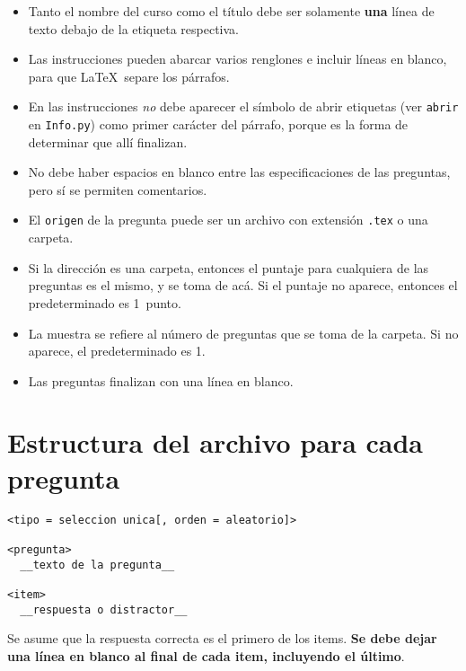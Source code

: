\documentclass[12pt]{article}
\theoremstyle{definition}
\begin{document}
\begin{itemize}
  \item Tanto el nombre del curso como el título debe ser solamente \textbf{una} línea de texto debajo de la etiqueta respectiva.
  \item Las instrucciones pueden abarcar varios renglones e incluir líneas en blanco, para que \LaTeX\ separe los párrafos. 
  \item En las instrucciones \emph{no} debe aparecer el símbolo de abrir etiquetas (ver \verb|abrir| en \verb|Info.py|) como primer carácter del párrafo, porque es la forma de determinar que allí finalizan.
  \item No debe haber espacios en blanco entre las especificaciones de las preguntas, pero sí se permiten comentarios.
  \item El \verb|origen| de la pregunta puede ser un archivo con extensión \verb|.tex| o una carpeta.
  \item Si la dirección es una carpeta, entonces el puntaje para cualquiera de las preguntas es el mismo, y se toma de acá. Si el puntaje no aparece, entonces el predeterminado es 1~punto.
  \item La muestra se refiere al n\'umero de preguntas que se toma de la carpeta. Si no aparece, el predeterminado es 1.
  \item Las preguntas finalizan con una línea en blanco.
\end{itemize}

\section{Estructura del archivo para cada pregunta}

\begin{verbatim}
<tipo = seleccion unica[, orden = aleatorio]>

<pregunta>
  __texto de la pregunta__

<item>
  __respuesta o distractor__

\end{verbatim}

Se asume que la respuesta correcta es el primero de los items. \textbf{Se debe dejar una l\'inea en blanco al final de cada item, incluyendo el \'ultimo}.
\end{document}
